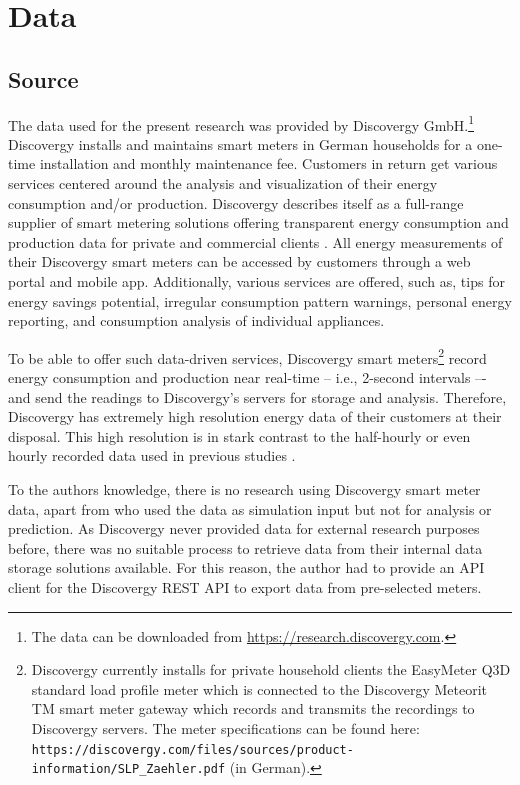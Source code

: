 
\section{Data}\label{Sec:Data}




\subsection{Source}\label{Sec:Data;Subsec:Source}

The data used for the present research was provided by Discovergy GmbH.\footnote{The data can be downloaded from \href{https://research.discovergy.com}{https://research.discovergy.com}.} Discovergy installs and maintains smart meters in German households for a one-time installation and monthly maintenance fee. Customers in return get various services centered around the analysis and visualization of their energy consumption and/or production. Discovergy describes itself as a full-range supplier of smart metering solutions offering transparent energy consumption and production data for private and commercial clients \citep{Discovergy:2018}. All energy measurements of their Discovergy smart meters can be accessed by customers through a web portal and mobile app. Additionally, various services are offered, such as, tips for energy savings potential, irregular consumption pattern warnings, personal energy reporting, and consumption analysis of individual appliances.

To be able to offer such data-driven services, Discovergy smart meters\footnote{Discovergy currently installs for private household clients the EasyMeter Q3D standard load profile meter which is connected to the Discovergy Meteorit TM smart meter gateway which records and transmits the recordings to Discovergy servers. The meter specifications can be found here: \texttt{https://discovergy.com/files/sources/product-information/SLP\_Zaehler.pdf} (in German).} record energy consumption and production near real-time -- i.e., 2-second intervals –- and send the readings to Discovergy's servers for storage and analysis. Therefore, Discovergy has extremely high resolution energy data of their customers at their disposal. This high resolution is in stark contrast to the half-hourly or even hourly recorded data used in previous studies \cite[e.g.,][]{Arora:2016,Auder:2018,Shi:2017,Gerossier:2017}.

To the authors knowledge, there is no research using Discovergy smart meter data, apart from \cite{Teixeira:2017} who used the data as simulation input but not for analysis or prediction. As Discovergy never provided data for external research purposes before, there was no suitable process to retrieve data from their internal data storage solutions available. For this reason, the author had to provide an API client for the Discovergy REST API to export data from pre-selected meters.


